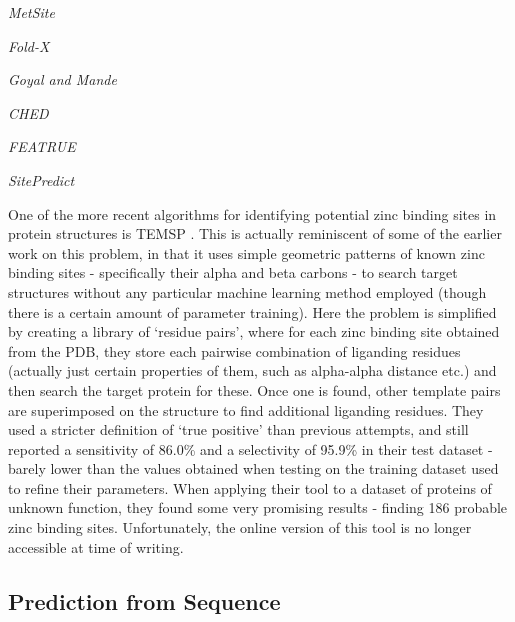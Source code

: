 \emph{MetSite}

\emph{Fold-X}

\emph{Goyal and Mande}

\emph{CHED}

\emph{FEATRUE}

\emph{SitePredict}

One of the more recent algorithms for identifying potential zinc binding sites in protein structures is TEMSP \cite{zhao2011structure}. This is actually reminiscent of some of the earlier work on this problem, in that it uses simple geometric patterns of known zinc binding sites - specifically their alpha and beta carbons - to search target structures without any particular machine learning method employed (though there is a certain amount of parameter training). Here the problem is simplified by creating a library of `residue pairs', where for each zinc binding site obtained from the PDB, they store each pairwise combination of liganding residues (actually just certain properties of them, such as alpha-alpha distance etc.) and then search the target protein for these. Once one is found, other template pairs are superimposed on the structure to find additional liganding residues. They used a stricter definition of `true positive' than previous attempts, and still reported a sensitivity of 86.0\% and a selectivity of 95.9\% in their test dataset - barely lower than the values obtained when testing on the training dataset used to refine their parameters. When applying their tool to a dataset of proteins of unknown function, they found some very promising results - finding 186 probable zinc binding sites.  Unfortunately, the online version of this tool is no longer accessible at time of writing.

\subsection{Prediction from Sequence}

